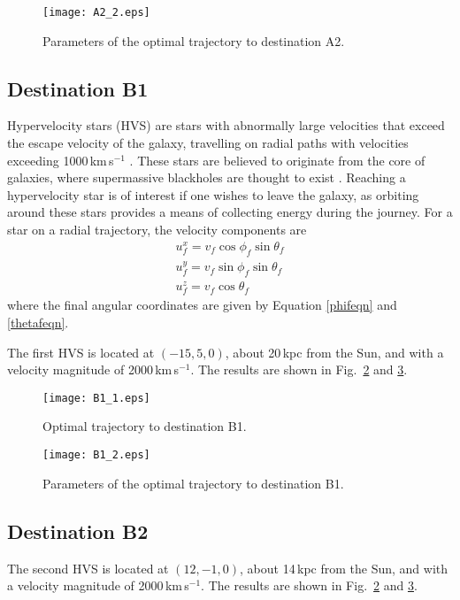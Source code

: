 \documentclass[review]{elsarticle}
\begin{document}
\begin{figure}[h!]
\centering
\texttt{[image: A2\_2.eps]}
\caption{Parameters of the optimal trajectory to destination A2.}
\label{A1_2}
\end{figure}

\subsection{Destination B1}
Hypervelocity stars (HVS) are stars with abnormally large velocities that exceed the escape velocity of the galaxy, travelling on radial paths with velocities exceeding 1000\,km\,s$^{-1}$ \citep{Baumgardt2006}. These stars are believed to originate from the core of galaxies, where supermassive blackholes are thought to exist \citep{Hills1988}. Reaching a hypervelocity star is of interest if one wishes to leave the galaxy, as orbiting around these stars provides a means of collecting energy during the journey. For a star on a radial trajectory, the velocity components are
\begin{gather}
u_f^x=v_f\cos\phi_f\sin\theta_f\\
u_f^y=v_f\sin\phi_f\sin\theta_f\\
u_f^z=v_f\cos\theta_f
\end{gather}
where the final angular coordinates are given by Equation \eqref{phifeqn} and \eqref{thetafeqn}.

The first HVS is located at $(-15,5,0)$, about 20\,kpc from the Sun, and with a velocity magnitude of 2000\,km\,s$^{-1}$. The results are shown in Fig.~\ref{B1_1} and \ref{B1_2}.

\begin{figure}[h!]
\centering
\texttt{[image: B1\_1.eps]}
\caption{Optimal trajectory to destination B1.}
\label{B1_1}
\end{figure}

\begin{figure}[h!]
\centering
\texttt{[image: B1\_2.eps]}
\caption{Parameters of the optimal trajectory to destination B1.}
\label{B1_2}
\end{figure}

\subsection{Destination B2}
The second HVS is located at $(12,-1,0)$, about 14\,kpc from the Sun, and with a velocity magnitude of 2000\,km\,s$^{-1}$. The results are shown in Fig.~\ref{B1_1} and \ref{B1_2}. 
\end{document}
